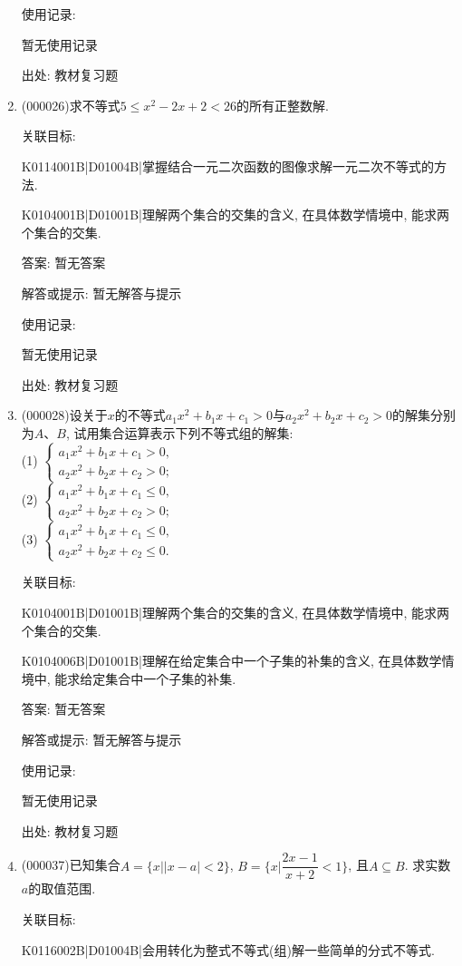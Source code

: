 \documentclass[10pt,a4paper]{article}
\begin{document}
\begin{enumerate}[1.]
使用记录:

暂无使用记录


出处: 教材复习题
\item { (000026)}求不等式$5\le x^2-2x+2<26$的所有正整数解.


关联目标:

K0114001B|D01004B|掌握结合一元二次函数的图像求解一元二次不等式的方法.

K0104001B|D01001B|理解两个集合的交集的含义, 在具体数学情境中, 能求两个集合的交集.

答案: 暂无答案

解答或提示: 暂无解答与提示

使用记录:

暂无使用记录


出处: 教材复习题
\item { (000028)}设关于$x$的不等式$a_1x^2+b_1x+c_1>0$与$a_2x^2+b_2x+c_2>0$的解集分别为$A$、$B$,
试用集合运算表示下列不等式组的解集:\\
(1) $\begin{cases} a_1x^2+b_1x+c_1>0, \\ a_2x^2+b_2x+c_2>0;\end{cases}$\\
(2) $\begin{cases} a_1x^2+b_1x+c_1\le 0, \\ a_2x^2+b_2x+c_2>0;\end{cases}$\\
(3) $\begin{cases} a_1x^2+b_1x+c_1\le 0, \\ a_2x^2+b_2x+c_2\le 0.\end{cases}$


关联目标:

K0104001B|D01001B|理解两个集合的交集的含义, 在具体数学情境中, 能求两个集合的交集.

K0104006B|D01001B|理解在给定集合中一个子集的补集的含义, 在具体数学情境中, 能求给定集合中一个子集的补集.

答案: 暂无答案

解答或提示: 暂无解答与提示

使用记录:

暂无使用记录


出处: 教材复习题
\item { (000037)}已知集合$A=\{x||x-a|<2\}$, $B=\{x|\dfrac{2x-1}{x+2}<1\}$, 且$A\subseteq B$. 求实数$a$的取值范围.


关联目标:

K0116002B|D01004B|会用转化为整式不等式(组)解一些简单的分式不等式.


\end{enumerate}
\end{document}
